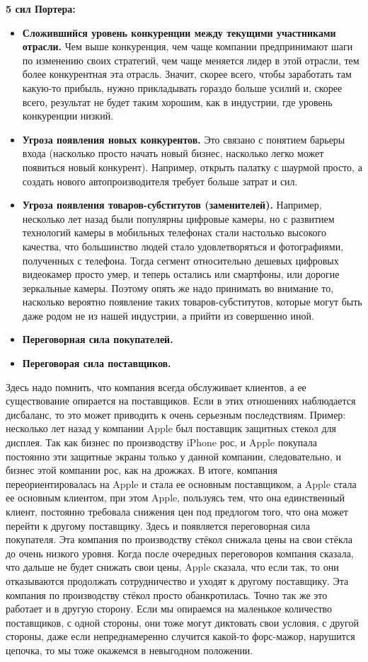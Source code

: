 \documentclass{article}
\begin{document}
	\textbf{5 сил Портера:}
	\begin{itemize}
	\item \textbf{Сложившийся уровень конкуренции между текущими участниками отрасли.} Чем выше конкуренция, чем чаще компании предпринимают шаги по изменению своих стратегий, чем чаще меняется лидер в этой отрасли, тем более конкурентная эта отрасль. Значит, скорее всего, чтобы заработать там какую-то прибыль, нужно прикладывать гораздо больше усилий и, скорее всего, результат не будет таким хорошим, как в индустрии, где уровень конкуренции низкий.
	\item \textbf{Угроза появления новых конкурентов.} Это связано с понятием барьеры входа (насколько просто начать новый бизнес, насколько легко может появиться новый конкурент). Например, открыть палатку с шаурмой просто, а создать нового автопроизводителя требует больше затрат и сил.
	\item \textbf{Угроза появления товаров-субститутов (заменителей).} Например, несколько лет назад были популярны цифровые камеры, но с развитием технологий камеры в мобильных телефонах стали настолько высокого качества, что большинство людей стало удовлетворяться и фотографиями, полученных с телефона. Тогда сегмент относительно дешевых цифровых видеокамер просто умер, и теперь остались или смартфоны, или дорогие зеркальные камеры. Поэтому опять же надо принимать во внимание то, насколько вероятно появление таких товаров-субститутов, которые могут быть даже родом не из нашей индустрии, а прийти из совершенно иной.
	\item \textbf{Переговорная сила покупателей.}
	\item \textbf{Переговорая сила поставщиков.}
	\end{itemize}
	Здесь надо помнить, что компания всегда обслуживает клиентов, а ее существование опирается на поставщиков. Если в этих отношениях наблюдается дисбаланс, то это может приводить к очень серьезным последствиям.
	Пример: несколько лет назад у компании Apple был поставщик защитных стекол для дисплея. Так как бизнес по производству iPhone рос, и Apple покупала постоянно эти защитные экраны только у данной компании, следовательно, и бизнес этой компании рос, как на дрожжах. В итоге, компания переориентировалась на Apple и стала ее основным поставщиком, а Apple стала ее основным клиентом, при этом Apple, пользуясь тем, что она единственный клиент, постоянно требовала снижения цен под предлогом того, что она может перейти к другому поставщику. Здесь и появляется переговорная сила покупателя. Эта компания по производству стёкол снижала цены на свои стёкла до очень низкого уровня. Когда после очередных переговоров компания сказала, что дальше не будет снижать свои цены, Apple сказала, что если так, то они отказываются продолжать сотрудничество и уходят к другому поставщику. Эта компания по производству стёкол просто обанкротилась. Точно так же это работает и в другую сторону. Если мы опираемся на маленькое количество поставщиков, с одной стороны, они тоже могут диктовать свои условия, с другой стороны, даже если непреднамеренно случится какой-то форс-мажор, нарушится цепочка, то мы тоже окажемся в невыгодном положении.
	
\end{document}
